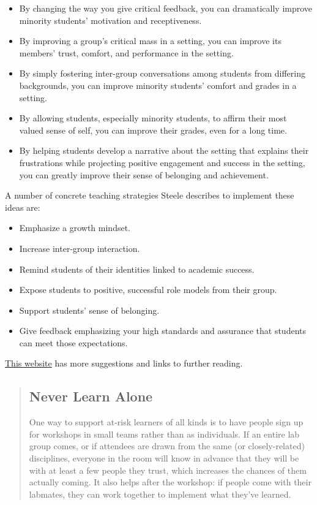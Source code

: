 \begin{itemize}
\item By changing the way you give critical feedback,
you can dramatically improve minority students' motivation and receptiveness.
\item By improving a group's critical mass in a setting,
you can improve its members' trust, comfort, and performance in the setting.
\item By simply fostering inter-group conversations among students from differing backgrounds,
you can improve minority students' comfort and grades in a setting.
\item By allowing students, especially minority students, to affirm their most valued sense of self,
you can improve their grades, even for a long time.
\item By helping students develop a narrative about the setting
that explains their frustrations while projecting positive engagement and success in the setting,
you can greatly improve their sense of belonging and achievement.
\end{itemize}

A number of concrete teaching strategies Steele describes
to implement these ideas are:

\begin{itemize}
\item Emphasize a growth mindset.
\item Increase inter-group interaction.
\item Remind students of their identities linked to academic success.
\item Expose students to positive, successful role models from their group.
\item Support students' sense of belonging.
\item Give feedback emphasizing your high standards and assurance that students can meet those expectations.
\end{itemize}

\href{http://www.reducingstereotypethreat.org/reduce.html}{This website} has more suggestions
and links to further reading.

\begin{quotation}   %
\subsection*{Never Learn Alone}

One way to support at-risk learners of all kinds is to have people sign up for workshops in small teams
rather than as individuals.
If an entire lab group comes,
or if attendees are drawn from the same (or closely-related) disciplines,
everyone in the room will know in advance
that they will be with at least a few people they trust,
which increases the chances of them actually coming.
It also helps after the workshop:
if people come with their labmates,
they can work together to implement what they've learned.
\end{quotation}   %

